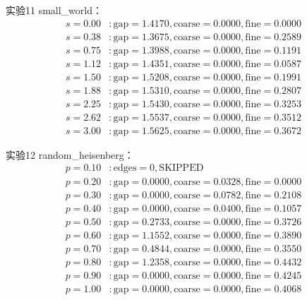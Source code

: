 \documentclass[11pt,a4paper]{book}
\theoremstyle{definition}
\begin{document}
实验11 small\_world：
\begin{align*}
s=0.00 &: \text{gap}=1.4170, \text{coarse}=0.0000, \text{fine}=0.0000 \\
s=0.38 &: \text{gap}=1.3675, \text{coarse}=0.0000, \text{fine}=0.2589 \\
s=0.75 &: \text{gap}=1.3988, \text{coarse}=0.0000, \text{fine}=0.1191 \\
s=1.12 &: \text{gap}=1.4351, \text{coarse}=0.0000, \text{fine}=0.0587 \\
s=1.50 &: \text{gap}=1.5208, \text{coarse}=0.0000, \text{fine}=0.1991 \\
s=1.88 &: \text{gap}=1.5310, \text{coarse}=0.0000, \text{fine}=0.2807 \\
s=2.25 &: \text{gap}=1.5430, \text{coarse}=0.0000, \text{fine}=0.3253 \\
s=2.62 &: \text{gap}=1.5537, \text{coarse}=0.0000, \text{fine}=0.3512 \\
s=3.00 &: \text{gap}=1.5625, \text{coarse}=0.0000, \text{fine}=0.3672
\end{align*}

实验12 random\_heisenberg：
\begin{align*}
p=0.10 &: \text{edges}=0, \text{SKIPPED} \\
p=0.20 &: \text{gap}=0.0000, \text{coarse}=0.0328, \text{fine}=0.0000 \\
p=0.30 &: \text{gap}=0.0000, \text{coarse}=0.0782, \text{fine}=0.2108 \\
p=0.40 &: \text{gap}=0.0000, \text{coarse}=0.0400, \text{fine}=0.1057 \\
p=0.50 &: \text{gap}=0.2733, \text{coarse}=0.0000, \text{fine}=0.3726 \\
p=0.60 &: \text{gap}=1.1552, \text{coarse}=0.0000, \text{fine}=0.3890 \\
p=0.70 &: \text{gap}=0.4844, \text{coarse}=0.0000, \text{fine}=0.3550 \\
p=0.80 &: \text{gap}=1.2358, \text{coarse}=0.0000, \text{fine}=0.4432 \\
p=0.90 &: \text{gap}=0.0000, \text{coarse}=0.0000, \text{fine}=0.4245 \\
p=1.00 &: \text{gap}=0.0000, \text{coarse}=0.0000, \text{fine}=0.4068
\end{align*}
\end{document}
